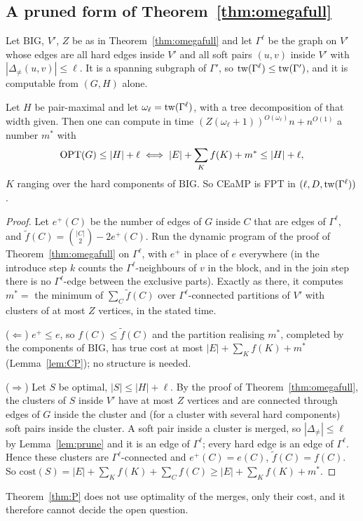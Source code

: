 \subsection{A pruned form of Theorem~\ref{thm:omegafull}}
Let $\mathrm{BIG}$, $V'$, $Z$ be as in Theorem~\ref{thm:omegafull} and let $\Gamma^\ell$ be the graph on $V'$ whose edges are all hard edges inside $V'$ and all soft pairs $(u,v)$ inside $V'$ with $|\Delta_{\neq}(u,v)|\le\ell$. It is a spanning subgraph of $\Gamma'$, so $\mathrm{tw}(\Gamma^\ell)\le\mathrm{tw}(\Gamma')$, and it is computable from $(G,H)$ alone.
\begin{theorem}\label{thm:P}
Let $H$ be pair-maximal and let $\omega_\ell=\mathrm{tw}(\Gamma^\ell)$, with a tree decomposition of that width given. Then one can compute in time $(Z(\omega_\ell+1))^{O(\omega_\ell)}n+n^{O(1)}$ a number $m^*$ with
\[
\mathrm{OPT}(G)\le|H|+\ell\iff|E|+\sum_Kf(K)+m^*\le|H|+\ell ,
\]
$K$ ranging over the hard components of $\mathrm{BIG}$. So CEaMP is FPT in $(\ell,D,\mathrm{tw}(\Gamma^\ell))$.
\end{theorem}
\begin{proof}
Let $e^+(C)$ be the number of edges of $G$ inside $C$ that are edges of $\Gamma^\ell$, and $\tilde f(C)=\binom{|C|}2-2e^+(C)$. Run the dynamic program of the proof of Theorem~\ref{thm:omegafull} on $\Gamma^\ell$, with $e^+$ in place of $e$ everywhere (in the introduce step $k$ counts the $\Gamma^\ell$-neighbours of $v$ in the block, and in the join step there is no $\Gamma^\ell$-edge between the exclusive parts). Exactly as there, it computes $m^*=$ the minimum of $\sum_C\tilde f(C)$ over $\Gamma^\ell$-connected partitions of $V'$ with clusters of at most $Z$ vertices, in the stated time.

($\Leftarrow$) $e^+\le e$, so $f(C)\le\tilde f(C)$ and the partition realising $m^*$, completed by the components of $\mathrm{BIG}$, has true cost at most $|E|+\sum_Kf(K)+m^*$ (Lemma~\ref{lem:CP}); no structure is needed.

($\Rightarrow$) Let $S$ be optimal, $|S|\le|H|+\ell$. By the proof of Theorem~\ref{thm:omegafull}, the clusters of $S$ inside $V'$ have at most $Z$ vertices and are connected through edges of $G$ inside the cluster and (for a cluster with several hard components) soft pairs inside the cluster. A soft pair inside a cluster is merged, so $|\Delta_{\neq}|\le\ell$ by Lemma~\ref{lem:prune} and it is an edge of $\Gamma^\ell$; every hard edge is an edge of $\Gamma^\ell$. Hence these clusters are $\Gamma^\ell$-connected and $e^+(C)=e(C)$, $\tilde f(C)=f(C)$. So $\mathrm{cost}(S)=|E|+\sum_Kf(K)+\sum_Cf(C)\ge|E|+\sum_Kf(K)+m^*$.
\end{proof}
Theorem~\ref{thm:P} does not use optimality of the merges, only their cost, and it therefore cannot decide the open question.

